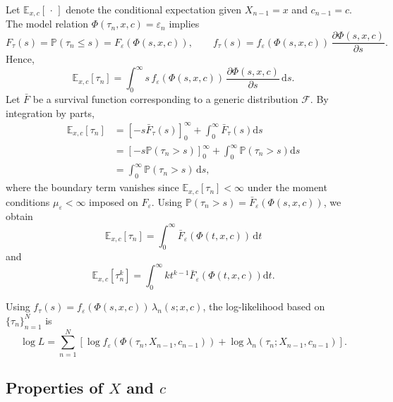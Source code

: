 \documentclass[11pt]{article}
\newcommand{\E}{\mathbb E}
\newcommand{\F}{\mathcal F}
\newcommand{\D}{\mathrm{d}}
\theoremstyle{definition}
\begin{document}
Let $\E_{x,c}[\,\cdot\,]$ denote the conditional expectation given $X_{n-1} =x$ and $c_{n-1} = c$.
The model relation
$\Phi(\tau_n,x,c)=\varepsilon_n$ implies
\[
F_{\tau}(s)=\mathbb{P}(\tau_n\le s)
=F_{\varepsilon}(\Phi(s,x,c)),
\qquad
f_{\tau}(s)=f_{\varepsilon}(\Phi(s,x,c))\,\frac{\partial \Phi(s,x,c)}{\partial s}.
\]
Hence,
\[
\mathbb{E}_{x,c}[\tau_n]
=\int_0^{\infty} s\, f_{\varepsilon}(\Phi(s,x,c))\, \frac{\partial \Phi(s,x,c)}{\partial s}\, \D s.
\]
Let $\bar F$ be a survival function corresponding to a generic distribution $\F$. 
By integration by parts,
$$
\begin{aligned}
	\mathbb{E}_{x,c}[\tau_n] &= \left[ -s \bar{F}_{\tau}(s) \right]_{0}^{\infty} + \int_{0}^{\infty} \bar{F}_{\tau}(s) \D s \\
	&= \left[ -s \mathbb P(\tau_n > s) \right]_{0}^{\infty} + \int_{0}^{\infty} \mathbb P(\tau_n > s) \D s \\
	& =\int_0^{\infty}\mathbb{P}(\tau_n>s)\, \D s,
\end{aligned}
$$
where the boundary term vanishes  since 
$\mathbb{E}_{x,c}[\tau_n] < \infty$ under the moment conditions 
$\mu_\varepsilon < \infty$ imposed on $F_\varepsilon$.
Using
$\mathbb{P}(\tau_n>s)=\bar F_{\varepsilon}(\Phi(s,x,c))$, we obtain
\begin{equation}
	\mathbb{E}_{x,c}[\tau_n]
	=\int_0^{\infty}\bar F_{\varepsilon}(\Phi(t,x,c))\,\D t \label{Eq:CE_tau}
\end{equation}
and
\begin{equation}
\mathbb{E}_{x,c}[\tau_n^k] = \int_0^\infty k t^{k-1} \bar{F}_\varepsilon(\Phi(t, x, c)) \D t. \label{Eq:CM_tau}
\end{equation}

Using $f_\tau(s) = f_\varepsilon(\Phi(s,x,c))\,\lambda_n(s;x,c)$, 
the log-likelihood based on $\{\tau_n\}_{n=1}^N$ is
\begin{equation}
	\log L
	=
	\sum_{n=1}^N
	\left[
	\log f_\varepsilon\!\left(\Phi(\tau_n, X_{n-1}, c_{n-1})\right)
	+
	\log \lambda_n(\tau_n; X_{n-1}, c_{n-1})
	\right].
\end{equation}



\subsection{Properties of $X$ and $c$}
\end{document}
